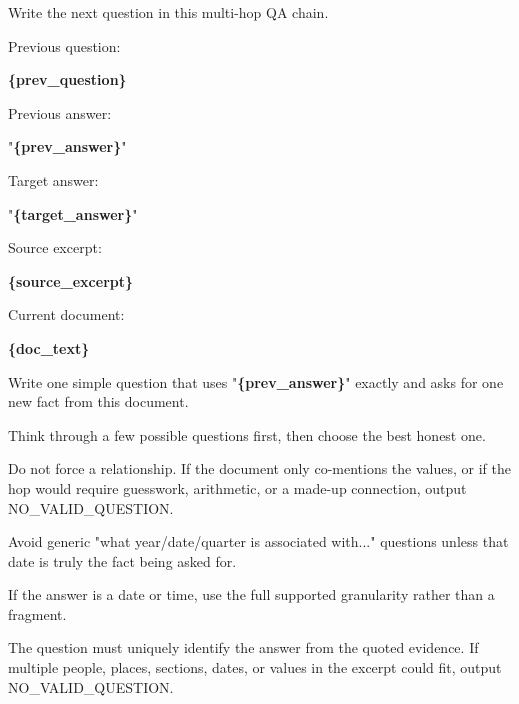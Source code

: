 \begin{tcolorbox}[colback=white, colframe=my-green, coltitle=black, parskip=5mm, title=\textbf{Next-Hop Question, Fixed Target}, halign=flush left, enhanced, breakable, skin first=enhanced, skin middle=enhanced, skin last=enhanced]
\begin{scriptsize}
\ttfamily
\setlength{\parindent}{0pt}
Write the next question in this multi-hop QA chain.\par
\mbox{}\par
Previous question:\par
\textcolor{my-green}{\textbf{\{prev\_question\}}}\par
\mbox{}\par
Previous answer:\par
"\textcolor{my-green}{\textbf{\{prev\_answer\}}}"\par
\mbox{}\par
Target answer:\par
"\textcolor{my-green}{\textbf{\{target\_answer\}}}"\par
\mbox{}\par
Source excerpt:\par
\textcolor{my-green}{\textbf{\{source\_excerpt\}}}\par
\mbox{}\par
Current document:\par
\textcolor{my-green}{\textbf{\{doc\_text\}}}\par
\mbox{}\par
Write one simple question that uses "\textcolor{my-green}{\textbf{\{prev\_answer\}}}" exactly and asks for one new fact from this document.\par
Think through a few possible questions first, then choose the best honest one.\par
Do not force a relationship. If the document only co-mentions the values, or if the hop would require guesswork, arithmetic, or a made-up connection, output NO\_VALID\_QUESTION.\par
Avoid generic "what year/date/quarter is associated with..." questions unless that date is truly the fact being asked for.\par
If the answer is a date or time, use the full supported granularity rather than a fragment.\par
The question must uniquely identify the answer from the quoted evidence. If multiple people, places, sections, dates, or values in the excerpt could fit, output NO\_VALID\_QUESTION.\par

\end{scriptsize}
\end{tcolorbox}
